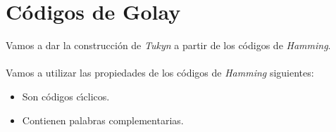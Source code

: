 %
%

\chapter{C\'odigos de Golay}

Vamos a dar la construcci\'on de \emph{Tukyn} a partir de los c\'odigos de
\emph{Hamming}.\\ \\
%
Vamos a utilizar las propiedades de los c\'odigos de \emph{Hamming} siguientes:
\begin{itemize}
\item Son c\'odigos c\'{\i}clicos.
\item Contienen palabras complementarias.
\end{itemize}

%
%



%
%



% 
%


